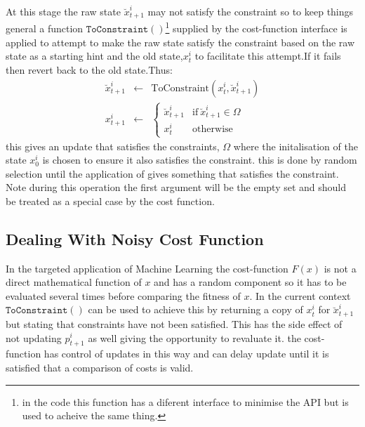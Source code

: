 \documentclass[a4paper,oneside,english]{article}
\numberwithin{equation}{section}
\numberwithin{figure}{section}
\begin{document}
At this stage the raw state $\breve{x}_{t+1}^i$ may not satisfy the constraint so to keep things general a function $\mathtt{ToConstraint()}$\footnote{in the code this function has a diferent interface to minimise the API but is used to acheive the same thing.} supplied by the cost-function interface is applied  to attempt to make the raw state  satisfy the constraint based on the raw state as a starting hint and the old state,$x_t^i$ to facilitate this attempt.If it fails then revert back to the old state.Thus: 
\begin{align}
\breve{x}_{t+1}^i&\leftarrow&\mathrm{ToConstraint}(x_t^i,\breve{x}_{t+1}^i)\\
x_{t+1}^i &\leftarrow& \left\lbrace
\begin{array}{cc}
\breve{x}_{t+1}^i& \mathrm{if}\: \breve{x}_{t+1}^i \in \Omega\\
x_t^i&\mathrm{otherwise}
\end{array}\right.
\end{align} 
this gives an update that satisfies the constraints, $\Omega$ where  the initalisation of the state $x_0^i$ is chosen to ensure it also satisfies the constraint. this is done by random selection until the application of  gives something that satisfies the constraint. Note during this operation the first argument will be the empty set and should be treated as a special case by the cost function.

\subsection{Dealing With  Noisy Cost Function}
In the targeted application of Machine Learning the cost-function $F(x)$ is not a direct mathematical function of $x$ and has a random component so it has to be evaluated several times before comparing the fitness of $x$. In the current context $\mathtt{ToConstraint()}$ can be used  to achieve this by returning a copy of $x_t^i$ for $\breve{x}_{t+1}^i$ but stating that constraints have not been satisfied. This has the side effect of not updating $p_{t+1}^i$ as well giving the opportunity to revaluate it. the cost-function has control of updates in this way and can delay update until it is satisfied that a comparison of costs is valid.
\end{document}
